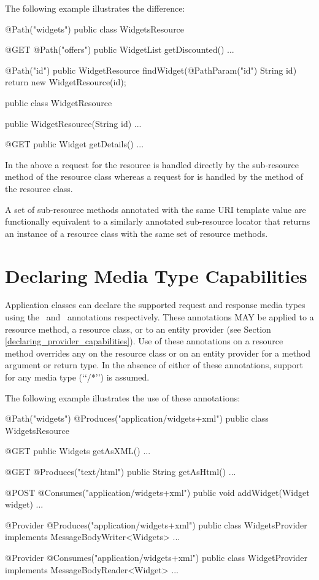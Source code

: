 The following example illustrates the difference:

\begin{listing}{1}
@Path("widgets")
public class WidgetsResource {
  @GET
  @Path("offers")
  public WidgetList getDiscounted() {...}
  
  @Path("{id}")
  public WidgetResource findWidget(@PathParam("id") String id) {
    return new WidgetResource(id);
  }
}

public class WidgetResource {
  public WidgetResource(String id) {...}

  @GET
  public Widget getDetails() {...}
}\end{listing}

In the above a  request for the  resource is handled directly by the  sub-resource method of the resource class  whereas a  request for  is handled by the  method of the  resource class.

\begin{nnnote}A set of sub-resource methods annotated with the same URI template value are functionally equivalent to a similarly annotated sub-resource locator that returns an instance of a resource class with the same set of resource methods.\end{nnnote}

\section{Declaring Media Type Capabilities}
\label{declaring_method_capabilities}

Application classes can declare the supported request and response media types using the \Consumes\ and \Produces\ annotations respectively. These annotations MAY be applied to a resource method, a resource class, or to an entity provider (see Section \ref{declaring_provider_capabilities}). Use of these annotations on a resource method overrides any on the resource class or on an entity provider for a method argument or return type. In the absence of either of these annotations, support for any media type (\lq\lq*/*\rq\rq) is assumed.

The following example illustrates the use of these annotations:

\begin{listing}{1}
@Path("widgets")
@Produces("application/widgets+xml")
public class WidgetsResource {
  
  @GET
  public Widgets getAsXML() {...}
  
  @GET
  @Produces("text/html")
  public String getAsHtml() {...}
  
  @POST
  @Consumes("application/widgets+xml")
  public void addWidget(Widget widget) {...}
}

@Provider
@Produces("application/widgets+xml")
public class WidgetsProvider implements MessageBodyWriter<Widgets> {...}

@Provider
@Consumes("application/widgets+xml")
public class WidgetProvider implements MessageBodyReader<Widget> {...}
\end{listing}


